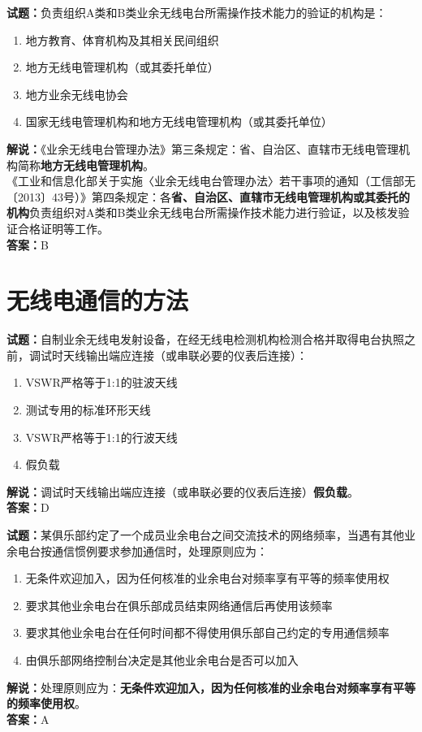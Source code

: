 \documentclass{ctexbook}
\begin{document}
\bigskip


\noindent\textbf{试题：}负责组织A类和B类业余无线电台所需操作技术能力的验证的机构是：
\begin{enumerate}[leftmargin=3em]
\item 地方教育、体育机构及其相关民间组织
\item 地方无线电管理机构（或其委托单位）
\item 地方业余无线电协会
\item 国家无线电管理机构和地方无线电管理机构（或其委托单位）
\end{enumerate}
\noindent\textbf{解说：}《业余无线电台管理办法》第三条规定：省、自治区、直辖市无线电管理机构简称\textbf{地方无线电管理机构}。\\
《工业和信息化部关于实施〈业余无线电台管理办法〉若干事项的通知（工信部无〔2013〕43号）》第四条规定：各\textbf{省、自治区、直辖市无线电管理机构或其委托的机构}负责组织对A类和B类业余无线电台所需操作技术能力进行验证，以及核发验证合格证明等工作。\\\noindent\textbf{答案：}B






\chapter{无线电通信的方法}




\noindent\textbf{试题：}自制业余无线电发射设备，在经无线电检测机构检测合格并取得电台执照之前，调试时天线输出端应连接（或串联必要的仪表后连接）：
\begin{enumerate}[leftmargin=3em]
\item VSWR严格等于1:1的驻波天线
\item 测试专用的标准环形天线
\item VSWR严格等于1:1的行波天线
\item 假负载
\end{enumerate}
\noindent\textbf{解说：}调试时天线输出端应连接（或串联必要的仪表后连接）\textbf{假负载}。\\\noindent\textbf{答案：}D



\bigskip


\noindent\textbf{试题：}某俱乐部约定了一个成员业余电台之间交流技术的网络频率，当遇有其他业余电台按通信惯例要求参加通信时，处理原则应为：
\begin{enumerate}[leftmargin=3em]
\item 无条件欢迎加入，因为任何核准的业余电台对频率享有平等的频率使用权
\item 要求其他业余电台在俱乐部成员结束网络通信后再使用该频率
\item 要求其他业余电台在任何时间都不得使用俱乐部自己约定的专用通信频率
\item 由俱乐部网络控制台决定是其他业余电台是否可以加入
\end{enumerate}
\noindent\textbf{解说：}处理原则应为：\textbf{无条件欢迎加入，因为任何核准的业余电台对频率享有平等的频率使用权}。\\\noindent\textbf{答案：}A
\end{document}
